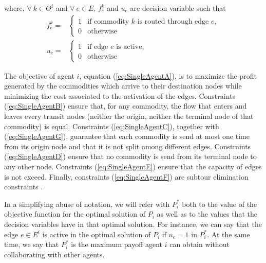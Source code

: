 \documentclass{article}
\begin{document}
where, $\forall\ k\in \Theta^i$ and  $\forall\ e \in E$, $f_e^k$ and $u_e$ are decision variable such that
\[
\begin{array}{rl}
f_e^k = & \begin{cases}
    1 & \text{if commodity } k \text{ is routed through edge } e,\\
    0 & \text{otherwise}
\end{cases}  \\[20pt]
u_e = &\begin{cases}
    1 & \text{if edge } e \text{ is active},\\
    0 & \text{otherwise}    
\end{cases}
\end{array}
\]

The objective of agent $i$, equation (\ref{eq:SingleAgentA}), is to maximize the
profit generated by the commodities which arrive to their destination nodes
while minimizing the cost associated to the activation of the edges. Constraints
(\ref{eq:SingleAgentB}) ensure that, for any commodity, the flow that enters
and leaves every transit nodes (neither the origin, neither the terminal node of
that commodity) is equal. Constraints (\ref{eq:SingleAgentC}), together with
(\ref{eq:SingleAgentG}), guarantee that each commodity is send at most one time
from its origin node and that it is not split among different edges. Constraints (\ref{eq:SingleAgentD}) ensure that no
commodity is send from its terminal node to any other node. Constraints (\ref{eq:SingleAgentE})
ensure that the capacity of edges is not exceed. Finally, constraints
(\ref{eq:SingleAgentF}) are subtour elimination constraints \parencite{AHUJA1993}. 


In a simplifying abuse of notation, we will refer with $P_i^*$ both to the value of the objective function for the optimal solution of $P_i$ as well as to the values that the decision variables have in that optimal solution. For instance, we can say that the edge $e\in E^i$ is active in the optimal solution of $P_i$ if $u_e=1$ in $P_i^*$. At the same time, we say that $P_i^*$ is the maximum payoff agent $i$ can obtain without collaborating with other agents.
\end{document}
